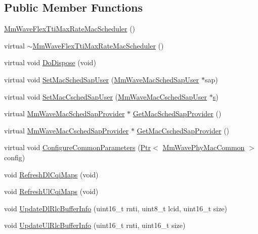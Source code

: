 \subsection*{Public Member Functions}
\begin{DoxyCompactItemize}
\item 
\hyperlink{classns3_1_1MmWaveFlexTtiMaxRateMacScheduler_aa78314a628e12f503c424f1cc97173f7}{Mm\+Wave\+Flex\+Tti\+Max\+Rate\+Mac\+Scheduler} ()
\item 
virtual \hyperlink{classns3_1_1MmWaveFlexTtiMaxRateMacScheduler_af61d8262a8421b25b4c58d572d634af8}{$\sim$\+Mm\+Wave\+Flex\+Tti\+Max\+Rate\+Mac\+Scheduler} ()
\item 
virtual void \hyperlink{classns3_1_1MmWaveFlexTtiMaxRateMacScheduler_ab9356ade4b890397a23886e45281c50c}{Do\+Dispose} (void)
\item 
virtual void \hyperlink{classns3_1_1MmWaveFlexTtiMaxRateMacScheduler_aaaf8133711d8e81b91c64d20aa0ded73}{Set\+Mac\+Sched\+Sap\+User} (\hyperlink{classns3_1_1MmWaveMacSchedSapUser}{Mm\+Wave\+Mac\+Sched\+Sap\+User} $\ast$sap)
\item 
virtual void \hyperlink{classns3_1_1MmWaveFlexTtiMaxRateMacScheduler_a606c6b33b44c60fce8b226850f7a4665}{Set\+Mac\+Csched\+Sap\+User} (\hyperlink{classns3_1_1MmWaveMacCschedSapUser}{Mm\+Wave\+Mac\+Csched\+Sap\+User} $\ast$\hyperlink{generate__test__data__lte__sinr_8m_ad83eeb3a142285d1243a08c6b7026df8}{s})
\item 
virtual \hyperlink{classns3_1_1MmWaveMacSchedSapProvider}{Mm\+Wave\+Mac\+Sched\+Sap\+Provider} $\ast$ \hyperlink{classns3_1_1MmWaveFlexTtiMaxRateMacScheduler_a9850a887c3c97f91b2c97c53e0bf5fe0}{Get\+Mac\+Sched\+Sap\+Provider} ()
\item 
virtual \hyperlink{classns3_1_1MmWaveMacCschedSapProvider}{Mm\+Wave\+Mac\+Csched\+Sap\+Provider} $\ast$ \hyperlink{classns3_1_1MmWaveFlexTtiMaxRateMacScheduler_a6351c62dc6baba1f8648497f968b9171}{Get\+Mac\+Csched\+Sap\+Provider} ()
\item 
virtual void \hyperlink{classns3_1_1MmWaveFlexTtiMaxRateMacScheduler_a24e3bb111ae4550babf8c29ab464f007}{Configure\+Common\+Parameters} (\hyperlink{classns3_1_1Ptr}{Ptr}$<$ \hyperlink{classns3_1_1MmWavePhyMacCommon}{Mm\+Wave\+Phy\+Mac\+Common} $>$ config)
\item 
void \hyperlink{classns3_1_1MmWaveFlexTtiMaxRateMacScheduler_a6c22516f87400ded1150b2fa468e0d8e}{Refresh\+Dl\+Cqi\+Maps} (void)
\item 
void \hyperlink{classns3_1_1MmWaveFlexTtiMaxRateMacScheduler_a9669a0f6636ea34d7f2d37628c33ad33}{Refresh\+Ul\+Cqi\+Maps} (void)
\item 
void \hyperlink{classns3_1_1MmWaveFlexTtiMaxRateMacScheduler_a446184ab542a4ed8d3c7725db38829bd}{Update\+Dl\+Rlc\+Buffer\+Info} (uint16\+\_\+t rnti, uint8\+\_\+t lcid, uint16\+\_\+t size)
\item 
void \hyperlink{classns3_1_1MmWaveFlexTtiMaxRateMacScheduler_a81234c07b6444f9595e713bd4183bdbe}{Update\+Ul\+Rlc\+Buffer\+Info} (uint16\+\_\+t rnti, uint16\+\_\+t size)
\end{DoxyCompactItemize}

